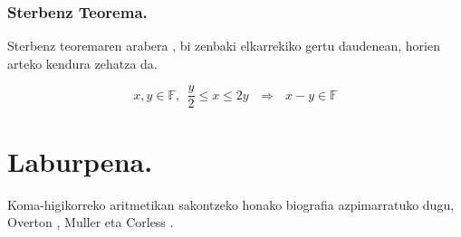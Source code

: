 \subsubsection*{Sterbenz Teorema.}
Sterbenz teoremaren arabera \cite{Sterbenz1973}, bi zenbaki elkarrekiko  gertu daudenean,  horien arteko kendura zehatza da.

\begin{equation}
\label{eq:4311}
x,y \in \mathbb{F}, \ \ \frac{y}{2}\leq x \leq 2y \ \ \ \Rightarrow \ \ \ x-y\in \mathbb{F}
\end{equation}




\section{Laburpena.}

Koma-higikorreko aritmetikan sakontzeko honako biografia azpimarratuko dugu, Overton \cite{Overton2001}, Muller  \cite{Muller2009} eta Corless \cite{Corless2013}.

